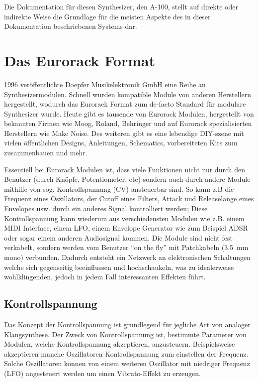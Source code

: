 Die Dokumentation für diesen Synthesizer, den A-100, stellt auf direkte oder indirekte Weise die Grundlage für die meisten Aspekte des in dieser Dokumentation beschriebenen Systems dar.

\section{Das Eurorack Format}
\label{sec:org90ff5b7}

1996 veröffentlichte Doepfer Musikelektronik GmbH eine Reihe an Synthesizermodulen. Schnell wurden kompatible Module von anderen Herstellern hergestellt, wodurch das Eurorack Format zum de-facto Standard für modulare Synthesizer wurde. Heute gibt es tausende von Eurorack Modulen, hergestellt von bekannten Firmen wie Moog, Roland, Behringer und auf Eurorack spezialisierten Herstellern wie Make Noise. Des weiteren gibt es eine lebendige DIY-szene mit vielen öffentlichen Designs, Anleitungen, Schematics, vorbereiteten Kits zum zusammenbauen und mehr.

Essentiell bei Eurorack Modulen ist, dass viele Funktionen nicht nur durch den Benutzer (durch Knöpfe, Potentiometer, etc) sondern auch durch andere Module mithilfe von sog. Kontrollspannung (CV) ansteuerbar sind. So kann z.B die Frequenz eines Oszillators, der Cutoff eines Filters, Attack und Releaselänge eines Envelopes usw. durch ein anderes Signal kontrolliert werden; Diese Kontrollspannung kann wiederum aus verschiedensten Modulen wie z.B. einem MIDI Interface, einem LFO, einem Envelope Generator wie zum Beispiel ADSR oder sogar einem anderen Audiosignal kommen. Die Module sind nicht fest verkabelt, sondern werden vom Benutzer ``on the fly'' mit Patchkabeln (\SI{3.5}{\mm} mono) verbunden. Dadurch entsteht ein Netzwerk an elektronischen Schaltungen welche sich gegenseitig beeinflussen und hochschaukeln, was zu idealerweise wohlklingenden, jedoch in jedem Fall interessanten Effekten führt.


\subsection{Kontrollspannung}
\label{sec:org2965e4e}
Das Konzept der Kontrollspannung ist grundlegend für jegliche Art von analoger Klangsynthese. Der Zweck von Kontrollspannung ist, bestimmte Parameter von Modulen, welche Kontrollspannung akzeptieren, anzusteuern. Beispielsweise akzeptieren manche Oszillatoren Kontrollspannung zum einstellen der Frequenz. Solche Oszillatoren können von einem weiteren Oszillator mit niedriger Frequenz (LFO) angesteuert werden um einen Vibrato-Effekt zu erzeugen.

